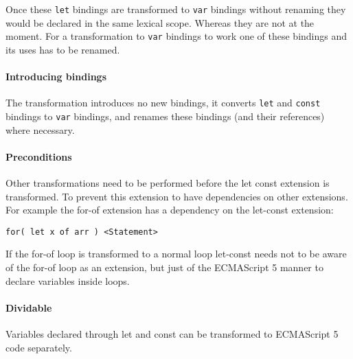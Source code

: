 Once these \lstinline$let$ bindings are transformed to \lstinline$var$ bindings without renaming they would be declared in the same lexical scope. Whereas they are not at the moment. For a transformation to \lstinline$var$ bindings to work one of these bindings and its uses has to be renamed.

\paragraph{Introducing bindings}
The transformation introduces no new bindings, it converts \lstinline$let$ and \lstinline$const$ bindings to \lstinline$var$ bindings, and renames these bindings (and their references) where necessary.

\paragraph{Preconditions}
Other transformations need to be performed before the let const extension is transformed. To prevent this extension to have dependencies on other extensions. For example the for-of extension has a dependency on the let-const extension:

\begin{lstlisting}
for( let x of arr ) <Statement>
\end{lstlisting}

If the for-of loop is transformed to a normal loop let-const needs not to be aware of the for-of loop as an extension, but just of the ECMAScript 5 manner to declare variables inside loops.

\paragraph{Dividable}
Variables declared through let and const can be transformed to ECMAScript 5 code separately.